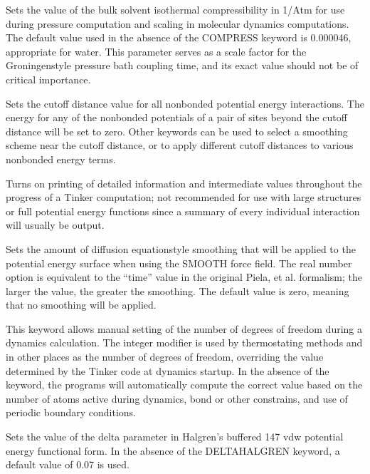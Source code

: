 \documentclass[letterpaper,11pt,english]{sphinxmanual}
\begin{document}
  Sets the value of the bulk solvent isothermal compressibility in 1/Atm for use during pressure computation and scaling in molecular dynamics computations. The default value used in the absence of the COMPRESS keyword is 0.000046, appropriate for water. This parameter serves as a scale factor for the Groningen\sphinxhyphen{}style pressure bath coupling time, and its exact value should not be of critical importance.

  Sets the cutoff distance value for all nonbonded potential energy interactions. The energy for any of the nonbonded potentials of a pair of sites beyond the cutoff distance will be set to zero. Other keywords can be used to select a smoothing scheme near the cutoff distance, or to apply different cutoff distances to various nonbonded energy terms.

  Turns on printing of detailed information and intermediate values throughout the progress of a Tinker computation; not recommended for use with large structures or full potential energy functions since a summary of every individual interaction will usually be output.

  Sets the amount of diffusion equation\sphinxhyphen{}style smoothing that will be applied to the potential energy surface when using the SMOOTH force field. The real number option is equivalent to the “time” value in the original Piela, et al. formalism; the larger the value, the greater the smoothing. The default value is zero, meaning that no smoothing will be applied.

  This keyword allows manual setting of the number of degrees of freedom during a dynamics calculation. The integer modifier is used by thermostating methods and in other places as the number of degrees of freedom, overriding the value determined by the Tinker code at dynamics startup. In the absence of the keyword, the programs will automatically compute the correct value based on the number of atoms active during dynamics, bond or other constrains, and use of periodic boundary conditions.

  Sets the value of the delta parameter in Halgren’s buffered 14\sphinxhyphen{}7 vdw potential energy functional form. In the absence of the DELTA\sphinxhyphen{}HALGREN keyword, a default value of 0.07 is used.
\end{document}
